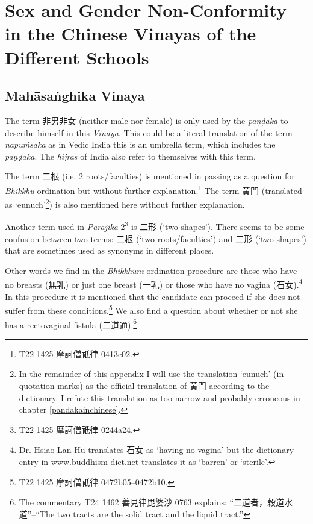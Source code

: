 \section{Sex and Gender Non-Conformity in the Chinese Vinayas of the Different Schools}
\label{appendix1}

\subsection{Mahāsaṅghika Vinaya}

The term 非男非女 (neither male nor female) is only used by the \textit{paṇḍaka} to describe himself in this \textit{Vinaya}. This could be a literal translation of the term \textit{napuṁsaka} as in Vedic India this is an umbrella term, which includes the \textit{paṇḍaka}. The \textit{hijras} of India also refer to themselves with this term.

The term 二根 (i.e. 2 roots/faculties) is mentioned in passing as a question for \textit{Bhikkhu} ordination but without further explanation.\footnote{T22 1425 摩訶僧祇律 0413c02.} The term 黃門 (translated as `eunuch'\footnote{In the remainder of this appendix I will use the translation `eunuch' (in quotation marks) as the official translation of 黃門 according to the dictionary. I refute this translation as too narrow and probably erroneous in chapter \ref{pandakainchinese}.}) is also mentioned here without further explanation.

Another term used in \textit{Pārājika} 2\footnote{T22 1425 摩訶僧祇律 0244a24.} is 二形 (`two shapes'). There seems to be some confusion between two terms: 二根 (`two roots/faculties') and 二形 (`two shapes') that are sometimes used as synonyms in different places.

Other words we find in the \textit{Bhikkhunī} ordination procedure are those who have no breasts (無乳) or just one breast (一乳) or those who have no vagina (石女).\footnote{Dr. Hsiao-Lan Hu translates 石女 as `having no vagina' but the dictionary entry in \href{http://www.buddhism-dict.net/cgi-bin/xpr-ddb.pl?q=石女}{www.buddhism-dict.net} translates it as `barren' or `sterile'.} In this procedure it is mentioned that the candidate can proceed if she does not suffer from these conditions.\footnote{T22 1425 摩訶僧祇律 0472b05–0472b10.} We also find a question about whether or not she has a rectovaginal fistula (二道通).\footnote{The commentary T24 1462 善見律毘婆沙 0763 explains: ``二道者，穀道水道''--``The two tracts are the solid tract and the liquid tract.''}


